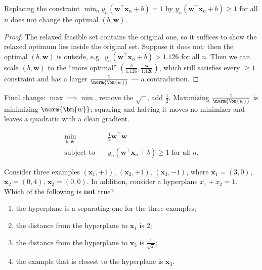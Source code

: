 \begin{lemma}
    Replacing the constraint \(\min_n y_n (\bm{w}^\top \bm{x}_n + b) = 1\)
    by \(y_n (\bm{w}^\top \bm{x}_n + b) \ge 1\) for all \(n\) does not change
    the optimal \((b, \bm{w})\).
\end{lemma}

\begin{proof}
    The relaxed feasible set contains the original one, so it suffices to
    show the relaxed optimum lies inside the original set. Suppose it does
    not: then the optimal \((b, \bm{w})\) is outside, e.g.\ \(y_n
    (\bm{w}^\top \bm{x}_n + b) > 1.126\) for all \(n\). Then we can scale
    \((b, \bm{w})\) to the ``more optimal'' \(\left( \frac{b}{1.126},
    \frac{\bm{w}}{1.126} \right)\), which still satisfies every \(\ge 1\)
    constraint and has a larger \(\frac{1}{\norm{\bm{w}}}\) --- a
    contradiction.
\end{proof}

Final change: \(\max \implies \min\), remove the \(\sqrt{\phantom{x}}\), add
\(\frac{1}{2}\). Maximizing \(\frac{1}{\norm{\bm{w}}}\) is minimizing
\(\norm{\bm{w}}\); squaring and halving it moves no minimizer and leaves a
quadratic with a clean gradient.

\begin{moral}
    \[
        \begin{aligned}
            \min_{b, \bm{w}} \quad & \frac{1}{2} \bm{w}^\top \bm{w}\\
            \text{subject to} \quad & y_n (\bm{w}^\top \bm{x}_n + b) \ge 1
                \text{ for all } n.
        \end{aligned}
    \]
\end{moral}

\begin{exercise}
    Consider three examples \((\bm{x}_1, +1)\), \((\bm{x}_2, +1)\),
    \((\bm{x}_3, -1)\), where \(\bm{x}_1 = (3, 0)\), \(\bm{x}_2 = (0, 4)\),
    \(\bm{x}_3 = (0, 0)\). In addition, consider a hyperplane \(x_1 + x_2 =
    1\). Which of the following is \textbf{not} true?
    \begin{enumerate}[(1)]
        \item the hyperplane is a separating one for the three examples;
        \item the distance from the hyperplane to \(\bm{x}_1\) is \(2\);
        \item the distance from the hyperplane to \(\bm{x}_3\) is
            \(\frac{1}{\sqrt{2}}\);
        \item the example that is closest to the hyperplane is \(\bm{x}_3\).
    \end{enumerate}
\end{exercise}

